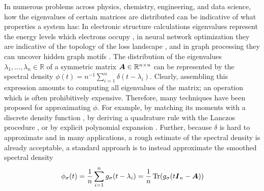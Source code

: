 \documentclass[12pt]{article}
\begin{document}
In numerous problems across physics, chemistry, engineering, and data science, how the eigenvalues of certain matrices are distributed can be indicative of what properties a system has: In electronic structure calculations eigenvalues represent the energy levels which electrons occupy \cite{lin-2017-randomized-estimation, drabold-1993-maximum-entropy, ducastelle-1970-moments-developments, haydock-1972-electronic-structure}, in neural network optimization they are indicative of the topology of the loss landscape \cite{yao-2020-pyhessian-neural, ghorbani-2019-investigation-neural}, and in graph processing they can uncover hidden graph motifs \cite{huang-2021-density-states}. The distribution of the eigenvalues $\lambda_1, \dots, \lambda_n \in \mathbb{R}$ of a symmetric matrix $\boldsymbol{A} \in \mathbb{R}^{n \times n}$ can be represented by the spectral density $\phi(t) = n^{-1} \sum_{i=1}^{n} \delta(t - \lambda_i)$. Clearly, assembling this expression amounts to computing all eigenvalues of the matrix; an operation which is often prohibitively expensive. Therefore, many techniques have been proposed for approximating $\phi$. For example, by matching its moments with a discrete density function \cite{cohen-steiner-2018-approximating-spectrum, braverman-2022-sublinear-time}, by deriving a quadrature rule with the Lanczos procedure \cite{lin-2016-approximating-spectral, chen-2021-analysis-stochastic}, or by explicit polynomial expansion \cite{weisse-2006-kernel-polynomial, lin-2016-approximating-spectral}. Further, because $\delta$ is hard to approximate and in many applications, a rough estimate of the spectral density is already acceptable, a standard approach is to instead approximate the smoothed spectral density
\begin{equation}
    \phi_{\sigma}(t) = \frac{1}{n} \sum_{i=1}^{n} g_{\sigma}(t - \lambda_i) = \frac{1}{n} \operatorname{Tr}(g_{\sigma}(t \boldsymbol{I}_n - \boldsymbol{A}))
    \label{equ:smoothed-spectral-density}
\end{equation}
\end{document}
